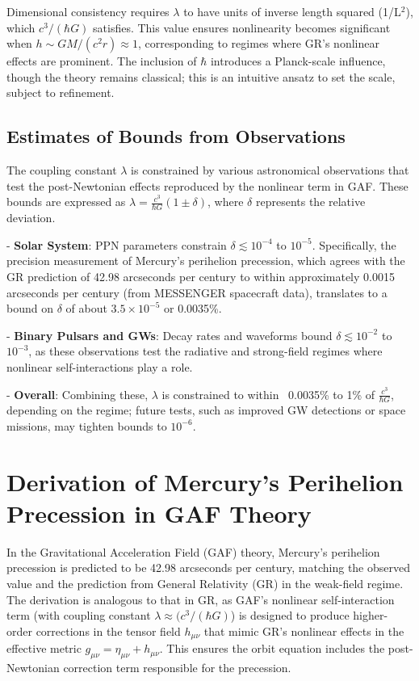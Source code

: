 \documentclass{article}
\begin{document}
Dimensional consistency requires \(\lambda\) to have units of inverse length squared (1/L$^2$), which \(c^3 / (\hbar G)\) satisfies. This value ensures nonlinearity becomes significant when \(h \sim GM/(c^2 r) \approx 1\), corresponding to regimes where GR's nonlinear effects are prominent. The inclusion of \(\hbar\) introduces a Planck-scale influence, though the theory remains classical; this is an intuitive ansatz to set the scale, subject to refinement.

\subsection{Estimates of Bounds from Observations}

The coupling constant \(\lambda\) is constrained by various astronomical observations that test the post-Newtonian effects reproduced by the nonlinear term in GAF. These bounds are expressed as \(\lambda = \frac{c^3}{\hbar G} (1 \pm \delta)\), where \(\delta\) represents the relative deviation.

- \textbf{Solar System}: PPN parameters constrain \(\delta \lesssim 10^{-4}\) to \(10^{-5}\). Specifically, the precision measurement of Mercury's perihelion precession, which agrees with the GR prediction of 42.98 arcseconds per century to within approximately 0.0015 arcseconds per century (from MESSENGER spacecraft data), translates to a bound on \(\delta\) of about \(3.5 \times 10^{-5}\) or 0.0035\%.

- \textbf{Binary Pulsars and GWs}: Decay rates and waveforms bound \(\delta \lesssim 10^{-2}\) to \(10^{-3}\), as these observations test the radiative and strong-field regimes where nonlinear self-interactions play a role.

- \textbf{Overall}: Combining these, \(\lambda\) is constrained to within ~0.0035\% to 1\% of \(\frac{c^3}{\hbar G}\), depending on the regime; future tests, such as improved GW detections or space missions, may tighten bounds to \(10^{-6}\).

\section{Derivation of Mercury's Perihelion Precession in GAF Theory}

In the Gravitational Acceleration Field (GAF) theory, Mercury's perihelion precession is predicted to be 42.98 arcseconds per century, matching the observed value and the prediction from General Relativity (GR) in the weak-field regime. The derivation is analogous to that in GR, as GAF's nonlinear self-interaction term (with coupling constant \(\lambda \approx (c^3 / (\hbar G)\)) is designed to produce higher-order corrections in the tensor field \(h_{\mu\nu}\) that mimic GR's nonlinear effects in the effective metric \(g_{\mu\nu} = \eta_{\mu\nu} + h_{\mu\nu}\). This ensures the orbit equation includes the post-Newtonian correction term responsible for the precession.
\end{document}
